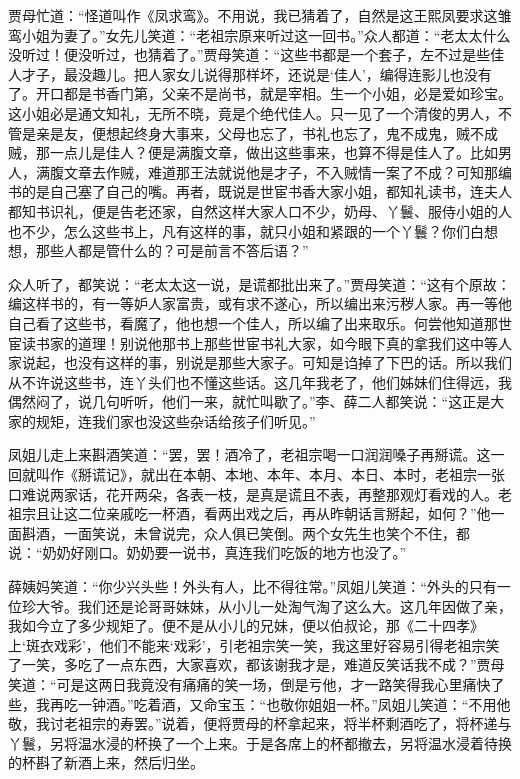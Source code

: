 \documentclass[12pt,oneside]{book}
\begin{document}
贾母忙道：“怪道叫作《凤求鸾》。不用说，我已猜着了，自然是这王熙凤要求这雏鸾小姐为妻了。”女先儿笑道：“老祖宗原来听过这一回书。”众人都道：“老太太什么没听过！便没听过，也猜着了。”贾母笑道：“这些书都是一个套子，左不过是些佳人才子，最没趣儿。把人家女儿说得那样坏，还说是‘佳人’，编得连影儿也没有了。开口都是书香门第，父亲不是尚书，就是宰相。生一个小姐，必是爱如珍宝。这小姐必是通文知礼，无所不晓，竟是个绝代佳人。只一见了一个清俊的男人，不管是亲是友，便想起终身大事来，父母也忘了，书礼也忘了，鬼不成鬼，贼不成贼，那一点儿是佳人？便是满腹文章，做出这些事来，也算不得是佳人了。比如男人，满腹文章去作贼，难道那王法就说他是才子，不入贼情一案了不成？可知那编书的是自己塞了自己的嘴。再者，既说是世宦书香大家小姐，都知礼读书，连夫人都知书识礼，便是告老还家，自然这样大家人口不少，奶母、丫鬟、服侍小姐的人也不少，怎么这些书上，凡有这样的事，就只小姐和紧跟的一个丫鬟？你们白想想，那些人都是管什么的？可是前言不答后语？”

众人听了，都笑说：“老太太这一说，是谎都批出来了。”贾母笑道：“这有个原故：编这样书的，有一等妒人家富贵，或有求不遂心，所以编出来污秽人家。再一等他自己看了这些书，看魔了，他也想一个佳人，所以编了出来取乐。何尝他知道那世宦读书家的道理！别说他那书上那些世宦书礼大家，如今眼下真的拿我们这中等人家说起，也没有这样的事，别说是那些大家子。可知是诌掉了下巴的话。所以我们从不许说这些书，连丫头们也不懂这些话。这几年我老了，他们姊妹们住得远，我偶然闷了，说几句听听，他们一来，就忙叫歇了。”李、薛二人都笑说：“这正是大家的规矩，连我们家也没这些杂话给孩子们听见。”

凤姐儿走上来斟酒笑道：“罢，罢！酒冷了，老祖宗喝一口润润嗓子再掰谎。这一回就叫作《掰谎记》，就出在本朝、本地、本年、本月、本日、本时，老祖宗一张口难说两家话，花开两朵，各表一枝，是真是谎且不表，再整那观灯看戏的人。老祖宗且让这二位亲戚吃一杯酒，看两出戏之后，再从昨朝话言掰起，如何？”他一面斟酒，一面笑说，未曾说完，众人俱已笑倒。两个女先生也笑个不住，都说：“奶奶好刚口。奶奶要一说书，真连我们吃饭的地方也没了。”

薛姨妈笑道：“你少兴头些！外头有人，比不得往常。”凤姐儿笑道：“外头的只有一位珍大爷。我们还是论哥哥妹妹，从小儿一处淘气淘了这么大。这几年因做了亲，我如今立了多少规矩了。便不是从小儿的兄妹，便以伯叔论，那《二十四孝》上‘斑衣戏彩’，他们不能来‘戏彩’，引老祖宗笑一笑，我这里好容易引得老祖宗笑了一笑，多吃了一点东西，大家喜欢，都该谢我才是，难道反笑话我不成？”贾母笑道：“可是这两日我竟没有痛痛的笑一场，倒是亏他，才一路笑得我心里痛快了些，我再吃一钟酒。”吃着酒，又命宝玉：“也敬你姐姐一杯。”凤姐儿笑道：“不用他敬，我讨老祖宗的寿罢。”说着，便将贾母的杯拿起来，将半杯剩酒吃了，将杯递与丫鬟，另将温水浸的杯换了一个上来。于是各席上的杯都撤去，另将温水浸着待换的杯斟了新酒上来，然后归坐。
\end{document}
